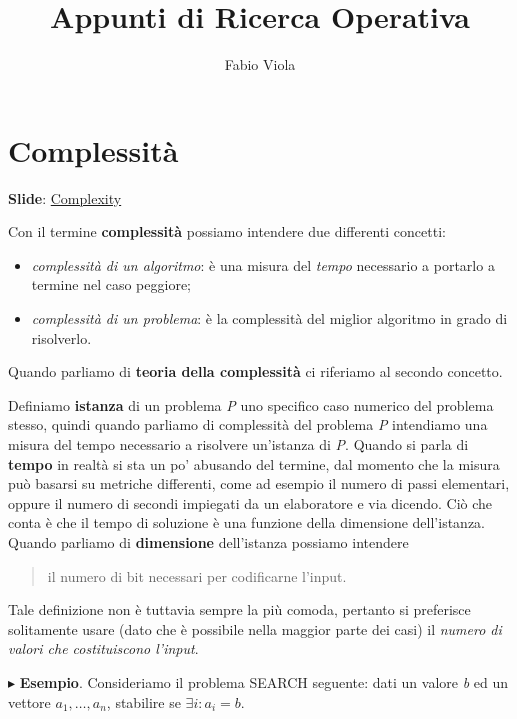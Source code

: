 \documentclass[11pt]{book}
\title{Appunti di Ricerca Operativa}
\author{Fabio Viola}
\date{}
\begin{document}
\chapter{Complessit\`a}

\scriptsize
{\bf Slide}:
\href{http://www.or.deis.unibo.it/staff_pages/martello/Chapter8.zip}{Complexity}
\normalsize
\vspace{20pt}

Con il termine {\bf complessit\`a} possiamo intendere due differenti
concetti:

\begin{itemize}
\item {\em complessit\`a di un algoritmo}: \`e una misura del {\em
  tempo} necessario a portarlo a termine nel caso peggiore;

\item {\em complessit\`a di un problema}: \`e la complessit\`a del
  miglior algoritmo in grado di risolverlo.
\end{itemize}

Quando parliamo di {\bf teoria della complessit\`a} ci riferiamo al
secondo concetto.

Definiamo {\bf istanza} di un problema {\em P} uno specifico caso
numerico del problema stesso, quindi quando parliamo di complessit\`a
del problema {\em P} intendiamo una misura del tempo necessario a
risolvere un'istanza di {\em P}. Quando si parla di {\bf tempo} in
realt\`a si sta un po' abusando del termine, dal momento che la misura
pu\`o basarsi su metriche differenti, come ad esempio il numero di
passi elementari, oppure il numero di secondi impiegati da un
elaboratore e via dicendo. Ci\`o che conta \`e che il tempo di
soluzione \`e una funzione della dimensione dell'istanza. Quando
parliamo di {\bf dimensione} dell'istanza possiamo intendere

\begin{quote}
il numero di bit necessari per codificarne l'input.  
\end{quote}

Tale definizione non \`e tuttavia sempre la pi\`u comoda, pertanto si
preferisce solitamente usare (dato che \`e possibile nella maggior
parte dei casi) il {\em numero di valori che costituiscono l'input}.

\vspace{11pt} $\blacktriangleright$ {\bf Esempio}. Consideriamo il
problema {\textsc SEARCH} seguente: dati un valore {\em b} ed un vettore
$a_1,\dots,a_n$, stabilire se $\exists i:a_i = b$.
\end{document}
